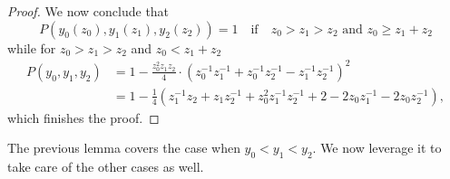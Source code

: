 \begin{proof}
We now conclude that
\[
	P(y_0(z_0), y_1(z_1), y_2(z_2)) = 1 \quad \text{if} \quad z_0 > z_1 > z_2 \text{ and } z_0 \geq z_1 + z_2
\]
while for $z_0 > z_1 > z_2$ and $z_0 < z_1 + z_2$
\begin{align*}
	P(y_0, y_1, y_2) 
	&= 1 - \frac{z_0^2z_1z_2}{4} \cdot \left( z_0^{-1}z_1^{-1}+z_0^{-1}z_2^{-1}-z_1^{-1}z_2^{-1} \right)^2 \\
	&= 1 - \frac{1}{4} \left( z_1^{-1}z_2 + z_1z_2^{-1} + z_0^2z_1^{-1}z_2^{-1} + 2 - 2z_0z_1^{-1}-2z_0z_2^{-1}\right),
\end{align*}
which finishes the proof.
\end{proof}

The previous lemma covers the case when $y_0<y_1<y_2$. We now leverage it to take care of the other cases as well. 

